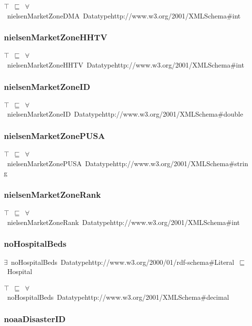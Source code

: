 \documentclass{article}
\begin{document}
\ensuremath{\top}~\ensuremath{\sqsubseteq}~\ensuremath{\forall}~nielsenMarketZoneDMA~Datatypehttp://www.w3.org/2001/XMLSchema#int

\subsubsection*{nielsenMarketZoneHHTV}

\ensuremath{\top}~\ensuremath{\sqsubseteq}~\ensuremath{\forall}~nielsenMarketZoneHHTV~Datatypehttp://www.w3.org/2001/XMLSchema#int

\subsubsection*{nielsenMarketZoneID}

\ensuremath{\top}~\ensuremath{\sqsubseteq}~\ensuremath{\forall}~nielsenMarketZoneID~Datatypehttp://www.w3.org/2001/XMLSchema#double

\subsubsection*{nielsenMarketZonePUSA}

\ensuremath{\top}~\ensuremath{\sqsubseteq}~\ensuremath{\forall}~nielsenMarketZonePUSA~Datatypehttp://www.w3.org/2001/XMLSchema#string

\subsubsection*{nielsenMarketZoneRank}

\ensuremath{\top}~\ensuremath{\sqsubseteq}~\ensuremath{\forall}~nielsenMarketZoneRank~Datatypehttp://www.w3.org/2001/XMLSchema#int

\subsubsection*{noHospitalBeds}

\ensuremath{\exists}~noHospitalBeds~Datatypehttp://www.w3.org/2000/01/rdf-schema#Literal~\ensuremath{\sqsubseteq}~Hospital

\ensuremath{\top}~\ensuremath{\sqsubseteq}~\ensuremath{\forall}~noHospitalBeds~Datatypehttp://www.w3.org/2001/XMLSchema#decimal

\subsubsection*{noaaDisasterID}
\end{document}
